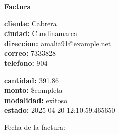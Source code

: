 \documentclass{article}
\begin{document}
\begin{center}
    {\LARGE \textbf{Factura}}\\[1cm]
\end{center}

\textbf{cliente:} Cabrera \\
\textbf{ciudad:} Cundinamarca \\
\textbf{direccion:} amalia91@example.net \\
\textbf{correo:} 7333828 \\
\textbf{telefono:} 904 \\

\vspace{0.5cm}

\textbf{cantidad:} 391.86 \\
\textbf{monto:} \$completa \\
\textbf{modalidad:} exitoso \\
\textbf{estado:} 2025-04-20 12:10:59.465650 \\

\vspace{1cm}

Fecha de la factura: 
\end{document}
